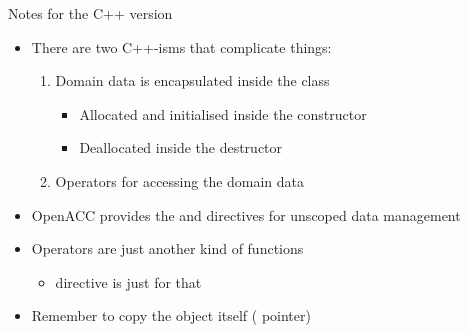 \documentclass[12pt,aspectratio=169]{beamer}
\begin{document}
\begin{frame}{Notes for the C++ version}
  \begin{itemize}
  \item There are two C++-isms that complicate things:
    \begin{enumerate}
    \item Domain data is encapsulated inside the  class
      \begin{itemize}
      \item Allocated and initialised inside the constructor
      \item Deallocated inside the destructor
      \end{itemize}
    \item Operators for accessing the domain data
    \end{enumerate}
    \vfill
  \item OpenACC provides the  and  directives for unscoped data management
  \item Operators are just another kind of functions
    \begin{itemize}
    \item {} directive is just for that
    \end{itemize}
  \item Remember to copy the object itself ( pointer)
  \end{itemize}
\end{frame}
\end{document}
